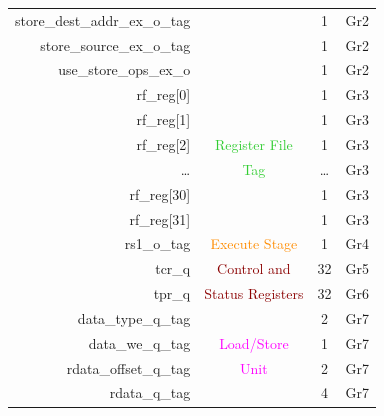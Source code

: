 \begin{table}[t]
\begin{tabular}{@{}rccc@{}}
        store\_dest\_addr\_ex\_o\_tag   &                                       & 1      & Gr2                         \\
        store\_source\_ex\_o\_tag       &                                       & 1      & Gr2                         \\
        use\_store\_ops\_ex\_o          &                                       & 1      & Gr2                         \\\hdashline
        rf\_reg[0]                      &                                       & 1      & Gr3                         \\
        rf\_reg[1]                      &                                       & 1      & Gr3                         \\
        rf\_reg[2]                      & \textcolor{LimeGreen}{Register File}  & 1      & Gr3                         \\
        \ldots                          & \textcolor{LimeGreen}{Tag}            & \ldots & Gr3                         \\
        rf\_reg[30]                     &                                       & 1      & Gr3                         \\
        rf\_reg[31]                     &                                       & 1      & Gr3                         \\\hdashline
        rs1\_o\_tag                     & \textcolor{DarkOrange}{Execute Stage} & 1      & Gr4                         \\\hdashline
        tcr\_q                          & \textcolor{DarkRed}{Control and}      & 32     & Gr5                         \\
        tpr\_q                          & \textcolor{DarkRed}{Status Registers} & 32     & Gr6                         \\\hdashline
        data\_type\_q\_tag              &                                       & 2      & Gr7                         \\
        data\_we\_q\_tag                & \textcolor{magenta}{Load/Store}       & 1      & Gr7                         \\
        rdata\_offset\_q\_tag           & \textcolor{magenta}{Unit}             & 2      & Gr7                         \\
        rdata\_q\_tag                   &                                       & 4      & Gr7                         \\
        \bottomrule
    \end{tabular}
\end{table}


